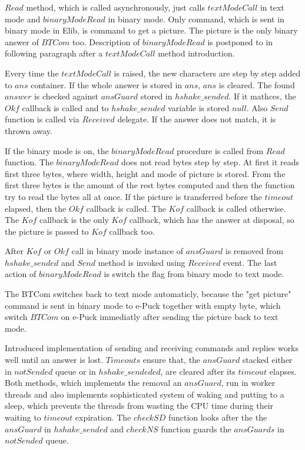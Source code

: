 	$Read$ method, which is called asynchronously, just calls $textModeCall$
	in text mode and $binaryModeRead$ in binary mode.
	Only command, which is sent in binary mode in Elib, is command to get a picture.
	The picture is the only binary answer of $BTCom$ too.
	Description of $binaryModeRead$ is postponed to in following paragraph after a 
	$textModeCall$ method introduction.
	
	Every time the $textModeCall$ is raised, the new characters are step by step
	added to $ans$ container. If the whole answer is stored in $ans$, $ans$ is cleared.
	The found $answer$ is checked against $ansGuard$ stored in $hshake\_sended$.
	If it mathces, the $Okf$ callback is called and to $hshake\_sended$ variable is stored $null$. 
	Also $Send$ function is called via $Received$ delegate. If the answer does not match, it is thrown away. 
	
	If the binary mode is on, the $binaryModeRead$ procedure is called from
	$Read$ function. The $binaryModeRead$ does not read bytes step by step.
	At first it reads first three bytes, where width, height and mode of picture is stored.
	From the first three bytes is the amount of the rest bytes computed and then
	the function try to read the bytes all at once.
	If the picture is transferred before the $timeout$ elapsed, then the $Okf$ callback is called.
	The $Kof$ callback is called otherwise. The $Kof$ callback is the only $Kof$ callback,
	which has the answer at disposal, so the picture is passed to $Kof$ callback too.

	After $Kof$ or $Okf$ call in binary mode instance of $ansGuard$ is removed from $hshake\_sended$ and $Send$ method is invoked
	using $Received$ event.
	The last action of $binaryModeRead$ is switch the flag from binary mode to text mode.
	
	The BTCom switches back to text mode automaticly, because
	the "get picture" command is sent in binary mode to e-Puck together with empty byte, which
	switch $BTCom$ on e-Puck  immediatly after sending the picture back to text mode.


	Introduced implementation of sending and receiving commands and replies works well 
	until an answer is lost. $Timeouts$ ensure that, the $ansGuard$ stacked either in $notSended$ queue
	or in $hshake\_sendeded$, are cleared after its $timeout$  elapses. Both methods,
	which implements the removal an $ansGuard$, run in worker threads and also implements
	sophisticated system of waking and putting to a sleep, which prevents the threads from wasting
	the CPU time during their waiting to $timeout$ expiration. 
	The $checkSD$ function looks after the the $ansGuard$ in $hshake\_sended$ and $checkNS$ function guards
	the $ansGuards$ in $notSended$ queue.

